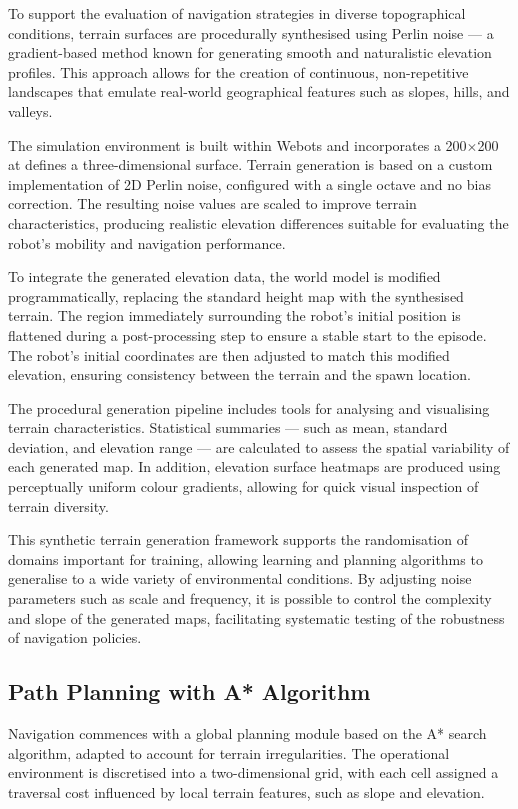 \documentclass[11pt,twocolumn]{article}
\begin{document}
To support the evaluation of navigation strategies in diverse topographical conditions, terrain surfaces are procedurally synthesised using Perlin noise — a gradient-based method known for generating smooth and naturalistic elevation profiles. This approach allows for the creation of continuous, non-repetitive landscapes that emulate real-world geographical features such as slopes, hills, and valleys.

The simulation environment is built within Webots and incorporates a  200\(\times\)200 at defines a three-dimensional surface. Terrain generation is based on a custom implementation of 2D Perlin noise, configured with a single octave and no bias correction. The resulting noise values are scaled to improve terrain characteristics, producing realistic elevation differences suitable for evaluating the robot's mobility and navigation performance.

To integrate the generated elevation data, the world model is modified programmatically, replacing the standard height map with the synthesised terrain. The region immediately surrounding the robot's initial position is flattened during a post-processing step to ensure a stable start to the episode. The robot's initial coordinates are then adjusted to match this modified elevation, ensuring consistency between the terrain and the spawn location.

The procedural generation pipeline includes tools for analysing and visualising terrain characteristics. Statistical summaries — such as mean, standard deviation, and elevation range — are calculated to assess the spatial variability of each generated map. In addition, elevation surface heatmaps are produced using perceptually uniform colour gradients, allowing for quick visual inspection of terrain diversity.

This synthetic terrain generation framework supports the randomisation of domains important for training, allowing learning and planning algorithms to generalise to a wide variety of environmental conditions. By adjusting noise parameters such as scale and frequency, it is possible to control the complexity and slope of the generated maps, facilitating systematic testing of the robustness of navigation policies.

\subsection{Path Planning with A* Algorithm}

Navigation commences with a global planning module based on the A* search algorithm, adapted to account for terrain irregularities. The operational environment is discretised into a two-dimensional grid, with each cell assigned a traversal cost influenced by local terrain features, such as slope and elevation.
\end{document}

